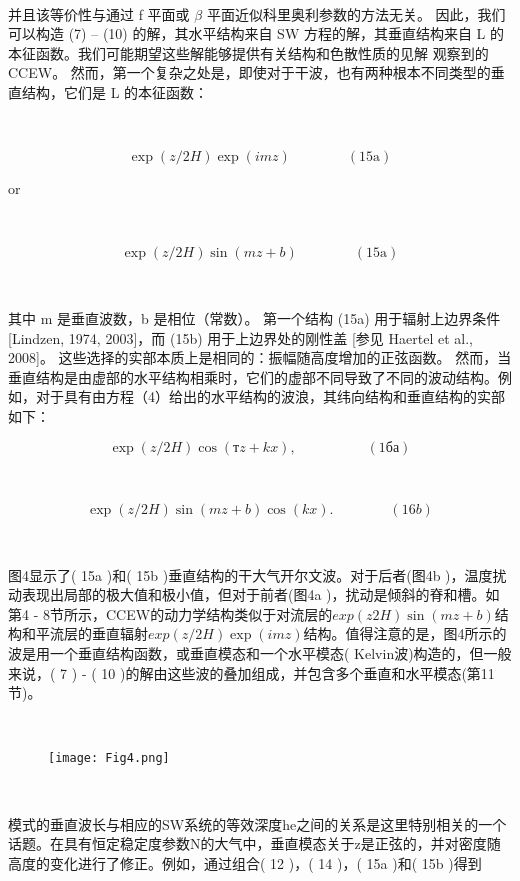 \documentclass{article}
\begin{document}
\begin{CJK*}{UTF8}{gbsn}
\ 

并且该等价性与通过 f 平面或 $\beta$ 平面近似科里奥利参数的方法无关。 因此，我们可以构造 (7) – (10) 的解，其水平结构来自 SW 方程的解，其垂直结构来自 L 的本征函数。我们可能期望这些解能够提供有关结构和色散性质的见解 观察到的 CCEW。 然而，第一个复杂之处是，即使对于干波，也有两种根本不同类型的垂直结构，它们是 L 的本征函数：


\ 


\[\exp(z/2H)\exp(imz)\quad\quad\quad\quad(15\text{a})\]


or


\ 

\[\exp(z/2H)\sin(mz+b)\quad\quad\quad\quad(15\text{a})\]



\ 

其中 m 是垂直波数，b 是相位（常数）。 第一个结构 (15a) 用于辐射上边界条件 [Lindzen, 1974, 2003]，而 (15b) 用于上边界处的刚性盖 [参见 Haertel et al., 2008]。 这些选择的实部本质上是相同的：振幅随高度增加的正弦函数。 然而，当垂直结构是由虚部的水平结构相乘时，它们的虚部不同导致了不同的波动结构。例如，对于具有由方程（4）给出的水平结构的波浪，其纬向结构和垂直结构的实部如下：

\[\exp(z/2H)\cos(\textit{т}z+kx),\quad\quad\quad\quad\quad(1ба)\]


\ 

\[\exp(z/2H)\sin(mz+b)\cos(kx).\quad\quad\quad\quad(16b)\]


\ 

图4显示了( 15a )和( 15b )垂直结构的干大气开尔文波。对于后者(图4b )，温度扰动表现出局部的极大值和极小值，但对于前者(图4a )，扰动是倾斜的脊和槽。如第4 - 8节所示，CCEW的动力学结构类似于对流层的$exp(z 2H )\sin(mz + b)$结构和平流层的垂直辐射$exp(z/2H)\exp(imz)$结构。值得注意的是，图4所示的波是用一个垂直结构函数，或垂直模态和一个水平模态( Kelvin波)构造的，但一般来说，( 7 ) - ( 10 )的解由这些波的叠加组成，并包含多个垂直和水平模态(第11节)。


\ 

\begin{figure}
    \centering
    \texttt{[image: Fig4.png]}

   
\end{figure}


\ 

模式的垂直波长与相应的SW系统的等效深度he之间的关系是这里特别相关的一个话题。在具有恒定稳定度参数N的大气中，垂直模态关于z是正弦的，并对密度随高度的变化进行了修正。例如，通过组合( 12 )，( 14 )，( 15a )和( 15b )得到



\end{CJK*}
\end{document}
